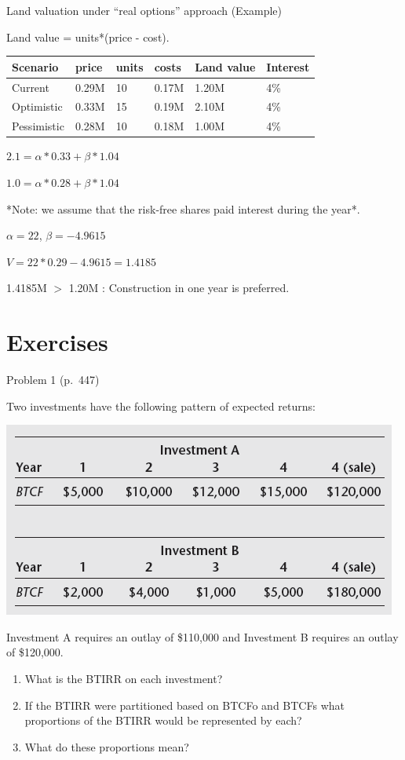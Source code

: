 \documentclass[ignorenonframetext,]{beamer}
\providecommand{\tightlist}{%
\setlength{\itemsep}{0pt}\setlength{\parskip}{0pt}}
\begin{document}
\begin{frame}{Land valuation under ``real options'' approach (Example)}

Land value = units*(price - cost).

\begin{longtable}[]{@{}llllll@{}}
\toprule
Scenario & price & units & costs & Land value & Interest\tabularnewline
\midrule
\endhead
Current & 0.29M & 10 & 0.17M & 1.20M & 4\%\tabularnewline
Optimistic & 0.33M & 15 & 0.19M & 2.10M & 4\%\tabularnewline
Pessimistic & 0.28M & 10 & 0.18M & 1.00M & 4\%\tabularnewline
\bottomrule
\end{longtable}

\(2.1 = \alpha*0.33 + \beta*1.04\)

\(1.0 = \alpha*0.28 + \beta*1.04\)

\footnotesize
*Note: we assume that the risk-free shares paid interest during the
year*. \small

\(\alpha = 22\), \(\beta = -4.9615\)

\(V = 22*0.29 -4.9615 = 1.4185\)

1.4185M \(>\) 1.20M : Construction in one year is preferred.

\normalsize

\end{frame}

\section{Exercises}\label{exercises}

\begin{frame}{Problem 1 (p.~447)}

Two investments have the following pattern of expected returns:

\begin{center}\includegraphics[width=200 px]{p1_447} \end{center}

Investment A requires an outlay of \$110,000 and Investment B requires
an outlay of \$120,000.

\begin{enumerate}
\def\labelenumi{\arabic{enumi}.}
\tightlist
\item
  What is the BTIRR on each investment?
\item
  If the BTIRR were partitioned based on BTCFo and BTCFs what
  proportions of the BTIRR would be represented by each?
\item
  What do these proportions mean?
\end{enumerate}

\end{frame}
\end{document}

